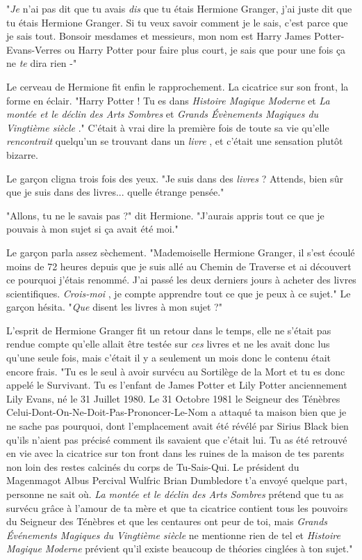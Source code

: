"\emph{Je}  n'ai pas dit que tu avais \emph{dis } que tu étais Hermione Granger, j'ai juste dit que tu étais Hermione Granger. Si tu veux savoir comment je le sais, c'est parce que je sais tout. Bonsoir mesdames et messieurs, mon nom est Harry James Potter-Evans-Verres ou Harry Potter pour faire plus court, je sais que pour une fois ça ne \emph{te}  dira rien -"

Le cerveau de Hermione fit enfin le rapprochement. La cicatrice sur son front, la forme en éclair. "Harry Potter ! Tu es dans \emph{Histoire Magique Moderne}  et \emph{La montée et le déclin des Arts Sombres}  et \emph{Grands Évènements Magiques du Vingtième siècle} ." C'était à vrai dire la première fois de toute sa vie qu'elle \emph{rencontrait}  quelqu'un se trouvant dans un \emph{livre} , et c'était une sensation plutôt bizarre.

Le garçon cligna trois fois des yeux. "Je suis dans des \emph{livres}  ? Attends, bien sûr que je suis dans des livres... quelle étrange pensée."

"Allons, tu ne le savais pas ?" dit Hermione. "J'aurais appris tout ce que je pouvais à mon sujet si ça avait été moi."

Le garçon parla assez sèchement. "Mademoiselle Hermione Granger, il s'est écoulé moins de 72 heures depuis que je suis allé au Chemin de Traverse et ai découvert ce pourquoi j'étais renommé. J'ai passé les deux derniers jours à acheter des livres scientifiques. \emph{Crois-moi} , je compte apprendre tout ce que je peux à ce sujet." Le garçon hésita. "\emph{Que}  disent les livres à mon sujet ?"

L'esprit de Hermione Granger fit un retour dans le temps, elle ne s'était pas rendue compte qu'elle allait être testée sur \emph{ces}  livres et ne les avait donc lus qu'une seule fois, mais c'était il y a seulement un mois donc le contenu était encore frais. "Tu es le seul à avoir survécu au Sortilège de la Mort et tu es donc appelé le Survivant. Tu es l'enfant de James Potter et Lily Potter anciennement Lily Evans, né le 31 Juillet 1980. Le 31 Octobre 1981 le Seigneur des Ténèbres Celui-Dont-On-Ne-Doit-Pas-Prononcer-Le-Nom a attaqué ta maison bien que je ne sache pas pourquoi, dont l'emplacement avait été révélé par Sirius Black bien qu'ils n'aient pas précisé comment ils savaient que c'était lui. Tu as été retrouvé en vie avec la cicatrice sur ton front dans les ruines de la maison de tes parents non loin des restes calcinés du corps de Tu-Sais-Qui. Le président du Magenmagot Albus Percival Wulfric Brian Dumbledore t'a envoyé quelque part, personne ne sait où. \emph{La montée et le déclin des Arts Sombres}  prétend que tu as survécu grâce à l'amour de ta mère et que ta cicatrice contient tous les pouvoirs du Seigneur des Ténèbres et que les centaures ont peur de toi, mais \emph{Grands Événements Magiques du Vingtième siècle}  ne mentionne rien de tel et \emph{Histoire Magique Moderne}  prévient qu'il existe beaucoup de théories cinglées à ton sujet."

